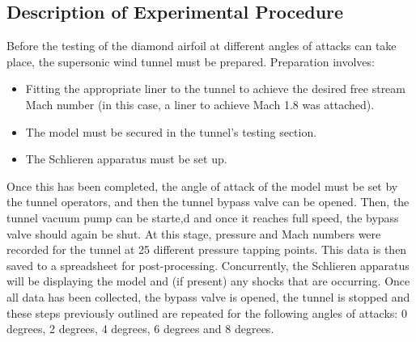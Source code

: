\documentclass[stu, a4paper, 12pt, floatsintext]{apa7}
\numberwithin{figure}{section}
\numberwithin{table}{section}
\numberwithin{equation}{section}
\begin{document}
\subsection{Description of Experimental Procedure}
Before the testing of the diamond airfoil at different angles of attacks can take place, the supersonic wind tunnel must be prepared. Preparation involves:
\begin{itemize}
    \item Fitting the appropriate liner to the tunnel to achieve the desired free stream Mach number (in this case, a liner to achieve Mach 1.8 was attached).
    \item The model must be secured in the tunnel’s testing section.
    \item The Schlieren apparatus must be set up.
\end{itemize}
Once this has been completed, the angle of attack of the model must be set by the tunnel operators, and then the tunnel bypass valve can be opened. Then, the tunnel vacuum pump can be starte,d and once it reaches full speed, the bypass valve should again be shut. At this stage, pressure and Mach numbers were recorded for the tunnel at 25 different pressure tapping points. This data is then saved to a spreadsheet for post-processing. Concurrently, the Schlieren apparatus will be displaying the model and (if present) any shocks that are occurring. Once all data has been collected, the bypass valve is opened, the tunnel is stopped and these steps previously outlined are repeated for the following angles of attacks: 0 degrees, 2 degrees, 4 degrees, 6 degrees and 8 degrees. 
\end{document}
